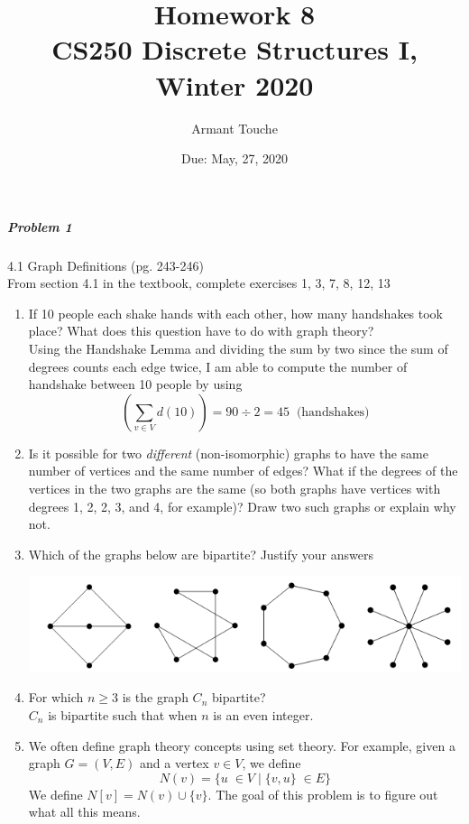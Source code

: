 \documentclass[11pt,a4paper]{article}
\title{\bf Homework 8\\[1ex]
\rm\normalsize CS250 Discrete Structures I, Winter 2020 }
\date{\normalsize Due: May, 27, 2020}
\author{\normalsize Armant Touche}
\newcommand\setItemNumber[1]{\setcounter{enumi}{\numexpr#1-1\relax}}
\begin{document}
 
\vspace{0cm}\maketitle 
	
	
	\subparagraph{Problem 1} 4.1 Graph Definitions (pg. 243-246) \\
			
		From section 4.1 in the textbook, complete exercises 1, 3, 7, 8, 12, 13

        \begin{enumerate}

        \item  If 10 people each shake hands with each other, how many handshakes took place? What does this question have to do with graph theory?\\
            Using the Handshake Lemma and dividing the sum by two since the sum of degrees counts each edge twice, I am able to compute the number of handshake between 10 people by using
            $$ (\sum_{v\in V} d(10)) = 90\div 2 = 45\;\;\text{(handshakes)}$$

        \setItemNumber{3}
    \item Is it possible for two \textit{different} (non-isomorphic) graphs to have the same number of vertices and the same number of edges? What if the degrees of the vertices in the two graphs are the same (so both graphs have vertices with degrees 1, 2, 2, 3, and 4, for example)? Draw two such graphs or explain why not.

        \setItemNumber{7}
        \item Which of the graphs below are bipartite? Justify your answers

            \begin{center}
            \includegraphics[width=.5\textwidth]{hw8_graphic1}
            \end{center}

        \item For which $n\geq 3$ is the graph $C_n$ bipartite?\\
            $C_n$ is bipartite such that when $n$ is an even integer.

        \setItemNumber{12}
    \item We often define graph theory concepts using set theory. For example, given a graph $G = (V, E)$ and a vertex $v\in V$, we define
        $$N(v) = \{u\;\in V\; |\; \{v,u\}\;\in E\}$$
        We define $N[v] = N(v)\cup \{v\}$. The goal of this problem is to figure out what all this means.
        \begin{enumerate}


\end{enumerate}
\end{enumerate}
\end{document}
